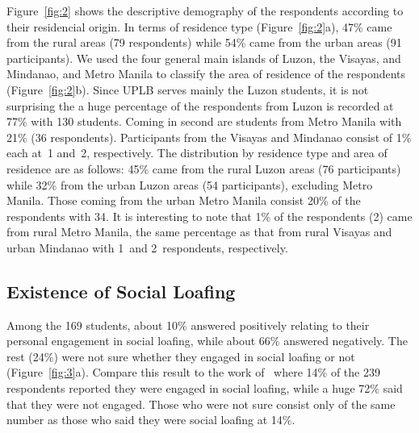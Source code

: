 \documentclass[a4paper,a4paper,BCOR12mm,12pt,abstracton,pointednumbers,tablecaptionabove,footinclude,halfparskip,normalheadings,]{scrartcl}
\begin{document}
Figure~\ref{fig:2} shows the descriptive demography of the respondents according to their residencial origin. In terms of residence type (Figure~\ref{fig:2}a), 47\% came from the rural areas (79 respondents) while 54\% came from the urban areas (91 participants). We used the four general main islands of Luzon, the Visayas, and Mindanao, and Metro Manila to classify the area of residence of the respondents (Figure~\ref{fig:2}b). Since UPLB serves mainly the Luzon students, it is not surprising the a huge percentage of the respondents from Luzon is recorded at 77\% with 130 students. Coming in second are students from Metro Manila with 21\% (36 respondents). Participants from the Visayas and Mindanao consist of 1\% each at~1 and~2, respectively. The distribution by residence type and area of residence are as follows: 45\% came from the rural Luzon areas (76 participants) while 32\% from the urban Luzon areas (54 participants), excluding Metro Manila. Those coming from the urban Metro Manila consist 20\% of the respondents with 34. It is interesting to note that 1\% of the respondents (2) came from rural Metro Manila, the same percentage as that from rural Visayas and urban Mindanao with 1~and 2~respondents, respectively.

\begin{figure*}[hbt]
\centering{}
\caption{The descriptive demographic distribution of the respondents according to place of residence data: (a)~By residence type, (b)~by area of origin, and (c)~by residence type  area of origin.}\label{fig:2}
\end{figure*}

\subsection{Existence of Social Loafing}

Among the 169 students, about 10\% answered positively relating to their personal engagement in social loafing, while about 66\% answered negatively. The rest (24\%) were not sure whether they engaged in social loafing or not (Figure~\ref{fig:3}a). Compare this result to the work of~\citet{Pabico08} where 14\% of the 239 respondents reported they were engaged in social loafing, while a huge 72\% said that they were not engaged. Those who were not sure consist only of the same number as those who said they were social loafing at 14\%. 

\begin{figure*}[hbt]
\centering{}
\caption{The respondents agreement that (a)~they were engaged in social loafing and (b)~their perception that their groupmates were engaged in social loafing. The data from seven years ago came from~\citet{Pabico08}.}\label{fig:3}
\end{figure*}
\end{document}
